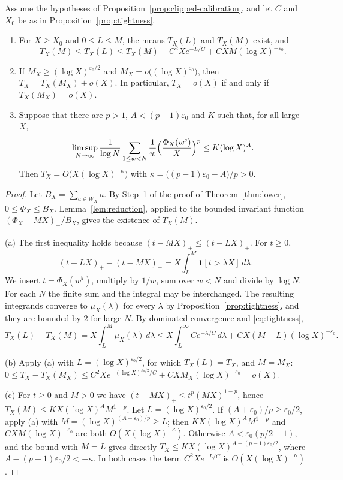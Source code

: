 \begin{corollary}
\label{cor:extreme-tail}
Assume the hypotheses of Proposition~\ref{prop:clipped-calibration}, and
let $C$ and $X_0$ be as in Proposition~\ref{prop:tightness}.
\begin{enumerate}[label=(\alph*)]
 \item For $X\ge X_0$ and $0\le L\le M$, the means $T_X(L)$ and $T_X(M)$
 exist, and
 \[
  T_X(M)\le T_X(L)\le T_X(M)+C^2Xe^{-L/C}+CXM(\log X)^{-\varepsilon_0}.
 \]
 \item If $M_X\ge(\log X)^{\varepsilon_0/2}$ and
 $M_X=o\bigl((\log X)^{\varepsilon_0}\bigr)$, then
 $T_X=T_X(M_X)+o(X)$. In particular, $T_X=o(X)$ if and only if
 $T_X(M_X)=o(X)$.
 \item Suppose that there are $p>1$, $A<(p-1)\varepsilon_0$ and $K$
 such that, for all large $X$,
 \[
  \limsup_{N\to\infty}\frac1{\log N}\sum_{1\le w<N}\frac1w
  \Bigl(\frac{\Phi_X(w^\flat)}X\Bigr)^p\le K(\log X)^A .
 \]
 Then $T_X=O\bigl(X(\log X)^{-\kappa}\bigr)$ with
 $\kappa=\bigl((p-1)\varepsilon_0-A\bigr)/p>0$.
\end{enumerate}
\end{corollary}

\begin{proof}
Let $B_X=\sum_{a\in W_X}a$. By Step~1 of the proof of
Theorem~\ref{thm:lower}, $0\le\Phi_X\le B_X$. Lemma~\ref{lem:reduction},
applied to the bounded invariant function $(\Phi_X-MX)_+/B_X$, gives the
existence of $T_X(M)$.

(a) The first inequality holds because $(t-MX)_+\le(t-LX)_+$. For
$t\ge0$,
\[
 (t-LX)_+-(t-MX)_+=X\int_L^M\mathbf 1[t>\lambda X]\,d\lambda .
\]
We insert $t=\Phi_X(w^\flat)$, multiply by $1/w$, sum over $w<N$ and
divide by $\log N$. For each $N$ the finite sum and the integral may be
interchanged. The resulting integrands converge to $\mu_X(\lambda)$ for
every $\lambda$ by Proposition~\ref{prop:tightness}, and they are bounded
by $2$ for large $N$. By dominated convergence and \eqref{eq:tightness},
\[
 T_X(L)-T_X(M)=X\int_L^M\mu_X(\lambda)\,d\lambda
 \le X\int_L^\infty Ce^{-\lambda/C}\,d\lambda+CX(M-L)(\log X)^{-\varepsilon_0}.
\]

(b) Apply (a) with $L=(\log X)^{\varepsilon_0/2}$, for which
$T_X(L)=T_X$, and $M=M_X$:
$0\le T_X-T_X(M_X)\le C^2Xe^{-(\log X)^{\varepsilon_0/2}/C}
+CXM_X(\log X)^{-\varepsilon_0}=o(X)$.

(c) For $t\ge0$ and $M>0$ we have $(t-MX)_+\le t^p(MX)^{1-p}$, hence
$T_X(M)\le KX(\log X)^AM^{1-p}$. Let $L=(\log X)^{\varepsilon_0/2}$. If
$(A+\varepsilon_0)/p\ge\varepsilon_0/2$, apply (a) with
$M=(\log X)^{(A+\varepsilon_0)/p}\ge L$; then
$KX(\log X)^AM^{1-p}$ and $CXM(\log X)^{-\varepsilon_0}$ are both
$O(X(\log X)^{-\kappa})$. Otherwise $A<\varepsilon_0(p/2-1)$, and the
bound with $M=L$ gives directly
$T_X\le KX(\log X)^{A-(p-1)\varepsilon_0/2}$, where
$A-(p-1)\varepsilon_0/2<-\kappa$. In both cases the term
$C^2Xe^{-L/C}$ is $O(X(\log X)^{-\kappa})$.
\end{proof}

